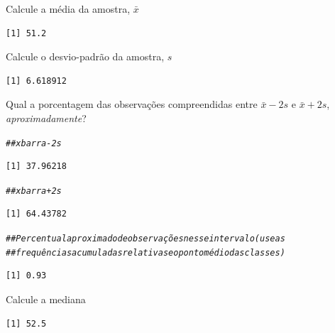 \documentclass[a4paper,11pt,fleqn]{article}\usepackage[]{graphicx}\usepackage[]{color}
\makeatletter
\newcommand{\hlcom}[1]{\textcolor[rgb]{0.4,0.4,0.4}{\textit{#1}}}%
\newenvironment{kframe}{%
 \def\at@end@of@kframe{}%
 \ifinner\ifhmode%
  \def\at@end@of@kframe{\end{minipage}}%
  \begin{minipage}{\columnwidth}%
 \fi\fi%
 \def\FrameCommand##1{\hskip\@totalleftmargin \hskip-\fboxsep
 \colorbox{shadecolor}{##1}\hskip-\fboxsep
     \hskip-\linewidth \hskip-\@totalleftmargin \hskip\columnwidth}%
 \MakeFramed {\advance\hsize-\width
   \@totalleftmargin\z@ \linewidth\hsize
   \@setminipage}}%
 {\par\unskip\endMakeFramed%
 \at@end@of@kframe}
\newenvironment{knitrout}{}{} %
\theoremstyle{definition}
\makeatother
\begin{document}
\begin{compactenum}[7.]
\begin{compactenum}
\begin{knitrout}
\end{knitrout}
\item Calcule a média da amostra, $\bar{x}$
\begin{knitrout}\small
{}\color{fgcolor}\begin{kframe}
\begin{verbatim}
[1] 51.2
\end{verbatim}
\end{kframe}
\end{knitrout}
\item Calcule o desvio-padrão da amostra, $s$
\begin{knitrout}\small
{}\color{fgcolor}\begin{kframe}
\begin{verbatim}
[1] 6.618912
\end{verbatim}
\end{kframe}
\end{knitrout}
\item Qual a porcentagem das observações compreendidas entre $\bar{x} -
  2s$ e $\bar{x} + 2s$, \textit{aproximadamente}?
\begin{knitrout}\small
{}\color{fgcolor}\begin{kframe}
\begin{alltt}
\hlcom{## xbarra - 2s}
\end{alltt}
\begin{verbatim}
[1] 37.96218
\end{verbatim}
\begin{alltt}
\hlcom{## xbarra + 2s}
\end{alltt}
\begin{verbatim}
[1] 64.43782
\end{verbatim}
\begin{alltt}
\hlcom{## Percentual aproximado de observações nesse intervalo (use as}
\hlcom{## frequências acumuladas relativas e o ponto médio das classes)}
\end{alltt}
\begin{verbatim}
[1] 0.93
\end{verbatim}
\end{kframe}
\end{knitrout}
\item Calcule a mediana
\begin{knitrout}\small
{}\color{fgcolor}\begin{kframe}
\begin{verbatim}
[1] 52.5
\end{verbatim}
\end{kframe}
\end{knitrout}
\end{compactenum}
\end{compactenum}
\end{document}
